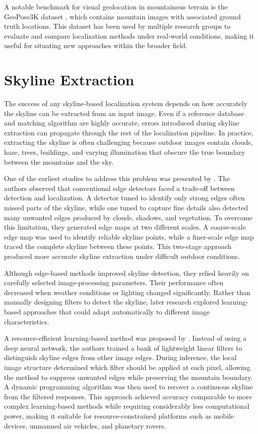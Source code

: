 A notable benchmark for visual geolocation in mountainous terrain is the GeoPose3K dataset \cite{brejcha2019geopose3k}, which contains mountain images with associated ground truth locations. This dataset has been used by multiple research groups to evaluate and compare localization methods under real-world conditions, making it useful for situating new approaches within the broader field.

\section{Skyline Extraction}

The success of any skyline-based localization system depends on how accurately the skyline can be extracted from an input image. Even if a reference database and matching algorithm are highly accurate, errors introduced during skyline extraction can propagate through the rest of the localization pipeline. In practice, extracting the skyline is often challenging because outdoor images contain clouds, haze, trees, buildings, and varying illumination that obscure the true boundary between the mountains and the sky.

One of the earliest studies to address this problem was presented by \cite{woo2007robust}. The authors observed that conventional edge detectors faced a trade-off between detection and localization. A detector tuned to identify only strong edges often missed parts of the skyline, while one tuned to capture fine details also detected many unwanted edges produced by clouds, shadows, and vegetation. To overcome this limitation, they generated edge maps at two different scales. A coarse-scale edge map was used to identify reliable skyline points, while a finer-scale edge map traced the complete skyline between these points. This two-stage approach produced more accurate skyline extraction under difficult outdoor conditions.

Although edge-based methods improved skyline detection, they relied heavily on carefully selected image-processing parameters. Their performance often decreased when weather conditions or lighting changed significantly. Rather than manually designing filters to detect the skyline, later research explored learning-based approaches that could adapt automatically to different image characteristics.

A resource-efficient learning-based method was proposed by \cite{ahmad2021resource}. Instead of using a deep neural network, the authors trained a bank of lightweight linear filters to distinguish skyline edges from other image edges. During inference, the local image structure determined which filter should be applied at each pixel, allowing the method to suppress unwanted edges while preserving the mountain boundary. A dynamic programming algorithm was then used to recover a continuous skyline from the filtered responses. This approach achieved accuracy comparable to more complex learning-based methods while requiring considerably less computational power, making it suitable for resource-constrained platforms such as mobile devices, unmanned air vehicles, and planetary rovers.

